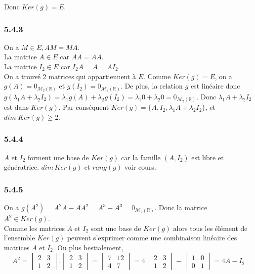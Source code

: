 \documentclass[]{book}
\theoremstyle{definition}
\newcommand{\bb}[1]{\mathbb{#1}}
\newcommand{\R}{\bb{R}}
\begin{document}
Donc $Ker(g) = E$. 

\subsubsection*{5.4.3}	
On a $M \in E, AM = MA$.\\
La matrice $A \in E$ car $AA =AA$.\\
La matrice $I_2 \in E$ car $I_2A = A = AI_2$.\\

On a trouv\'e 2 matrices qui appartiennent \`a $E$. Comme $Ker(g) = E$, on a $g(A) = 0_{\mathcal{M}_2(\R)}$ et $g(I_2) = 0_{\mathcal{M}_2(\R)}$. De plus, la relation $g$ est lin\'eaire donc $g(\lambda_1 A + \lambda_2 I_2) = \lambda_1g(A) + \lambda_2 g(I_2) = \lambda_1 0 + \lambda_2 0 = 0_{\mathcal{M}_2(\R)}$. Donc $\lambda_1 A + \lambda_2 I_2$ est dans $Ker(g)$. Par cons\'equent $Ker(g) = \{A,I_2,\lambda_1 A + \lambda_2 I_2\}$, et $dim\; Ker(g) \geq 2$.

\subsubsection*{5.4.4}	
$A$ et $I_2$ forment une base de $Ker(g)$ car la famille $(A,I_2)$ est libre et g\'en\'eratrice. 
$dim\, Ker(g)$ et $rang(g)$ voir cours.


\subsubsection*{5.4.5}	
On a $g(A^2) = A^2A - AA^2 = A^3 - A^3 = 0_{\mathcal{M}_2(\R)}$. Donc la matrice $A^2 \in Ker(g)$.\\

Comme les matrices $A$ et $I_2$ sont une base de $Ker(g)$ alors tous les \'el\'ement de l'ensemble $Ker(g)$ peuvent s'exprimer comme une combinaison lin\'eaire des matrices  $A$ et $I_2$.
Ou plus bestialement,
$$A^2 = 
\begin{vmatrix} 2 & 3 \\ 1 & 2 \end{vmatrix} . \begin{vmatrix} 2 & 3 \\ 1 & 2 \end{vmatrix} =
\begin{vmatrix} 7 & 12 \\ 4 & 7 \end{vmatrix}  = 
4\begin{vmatrix} 2 & 3 \\ 1 & 2 \end{vmatrix} - \begin{vmatrix} 1 & 0 \\ 0 & 1 \end{vmatrix} =
4A -I_2
$$
\end{document}

